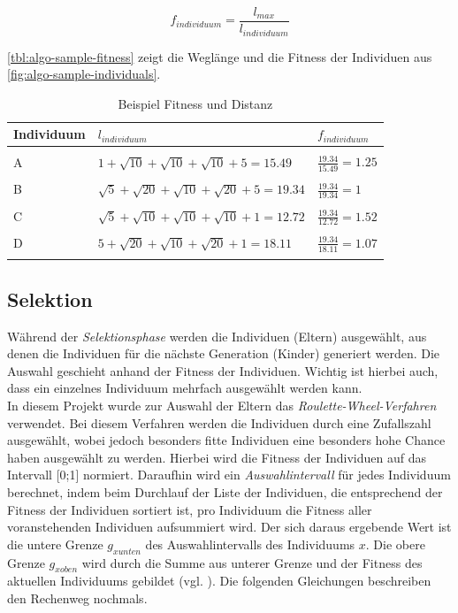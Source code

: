\documentclass[12pt,a4paper]{scrreprt}
\begin{document}
$$
f_{individuum} = \frac{l_{max}}{l_{individuum}}
$$

\autoref{tbl:algo-sample-fitness} zeigt die Weglänge und die Fitness der Individuen aus \autoref{fig:algo-sample-individuals}.

\begin{center}
\begin{longtable}{p{2.5cm} | p{6.5cm} | p{3.0cm}}
Individuum & $l_{individuum}$ & $f_{individuum}$ \\
\hline & & \\
A & $1 + \sqrt{10} + \sqrt{10} + \sqrt{10} + 5 = 15.49$ & $\frac{19.34}{15.49} = 1.25$ \\
& & \\
B & $\sqrt{5} + \sqrt{20} + \sqrt{10} + \sqrt{20} + 5 = 19.34$ & $\frac{19.34}{19.34} = 1$ \\
& & \\
C & $\sqrt{5} + \sqrt{10} + \sqrt{10} + \sqrt{10} + 1 = 12.72$ & $\frac{19.34}{12.72} = 1.52$ \\
& & \\
D & $5 + \sqrt{20} + \sqrt{10} + \sqrt{20} + 1 = 18.11$ & $\frac{19.34}{18.11} = 1.07$\\

\caption{Beispiel Fitness und Distanz}
\label{tbl:algo-sample-fitness}
\end{longtable}
\end{center}

\subsection{Selektion}
\label{subsec:selection}

Während der \textit{Selektionsphase} werden die Individuen (Eltern) ausgewählt, aus denen die Individuen für die nächste Generation (Kinder) generiert werden. Die Auswahl geschieht anhand der Fitness der Individuen. Wichtig ist hierbei auch, dass ein einzelnes Individuum mehrfach ausgewählt werden kann.\\
In diesem Projekt wurde zur Auswahl der Eltern das \textit{Roulette-Wheel-Verfahren} verwendet. Bei diesem Verfahren werden die Individuen durch eine Zufallszahl ausgewählt, wobei jedoch besonders fitte Individuen eine besonders hohe Chance haben ausgewählt zu werden. Hierbei wird die Fitness der Individuen auf das Intervall [0;1] normiert. Daraufhin wird ein \textit{Auswahlintervall} für jedes Individuum berechnet, indem beim Durchlauf der Liste der Individuen, die entsprechend der Fitness der Individuen sortiert ist, pro Individuum die Fitness aller voranstehenden Individuen aufsummiert wird. Der sich daraus ergebende Wert ist die untere Grenze $g_{x unten}$ des Auswahlintervalls des Individuums $x$. Die obere Grenze $g_{x oben}$ wird durch die Summe aus unterer Grenze und der Fitness des aktuellen Individuums gebildet (vgl. \cite{rongqu14}). Die folgenden Gleichungen beschreiben den Rechenweg nochmals.
\end{document}
